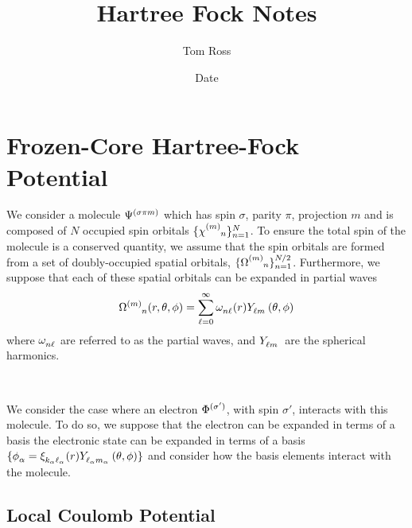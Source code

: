 \documentclass[draft]{article}
\title{Hartree Fock Notes}
\author{Tom Ross}
\date{Date}
\begin{document}
\newcommand{\molecule}[1][]{\Psi\indices{#1}}
\newcommand{\orbitalspin}[1][]{\chi\indices{#1}}

\newcommand{\orbital}[1][]{\Omega\indices{#1}}
\newcommand{\orbitalpw}[1][]{\omega\indices{#1}}

\newcommand{\electron}[1][]{\Phi\indices{#1}}
\newcommand{\sturmian}[1][]{\phi\indices{#1}}
\newcommand{\laguerre}[1][]{\xi\indices{#1}}

\newcommand{\harmonic}[1][]{Y\indices{#1}}
\newcommand{\irrep}[1][]{C\indices{#1}}

\newcommand{\spin}{\sigma}
\newcommand{\parity}{\pi}
\newcommand{\proj}{m}
\renewcommand{\ang}{\ell}

\section{Frozen-Core Hartree-Fock Potential}
\label{sec:frozen-core-hartree}

We consider a molecule $\molecule[^{\lr{\spin \pi \proj}}]$ which has spin
$\spin$, parity $\pi$, projection $\proj$ and is composed of $N$ occupied
spin orbitals $\lrset{\orbitalspin[^{\lr{\proj}}_n]}_{n = 1}^{N}$.  To ensure
the total spin of the molecule is a conserved quantity, we assume that the spin
orbitals are formed from a set of doubly-occupied spatial orbitals,
$\lrset{\orbital[^{\lr{\proj}}_n]}_{n = 1}^{N/2}$.  Furthermore, we suppose that
each of these spatial orbitals can be expanded in partial waves
\begin{equation*}
  \orbital[^{\lr{\proj}}_n]\lr{r, \theta, \phi}
  =
  \sum_{\ang = 0}^{\infty}
  \orbitalpw[_{n \ang}]\lr{r}
  \harmonic[_{\ang \proj}]\lr{\theta, \phi}
\end{equation*}
where $\orbitalpw[_{n \ang}]$ are referred to as the partial waves, and
$\harmonic[_{\ang \proj}]$ are the spherical harmonics.

~

We consider the case where an electron $\electron[^{\lr{\spin'}}]$, with spin
$\spin'$, interacts with this molecule.
To do so, we suppose that the electron can be expanded in terms of a basis
the electronic state can be expanded in terms of a basis
$\lrset{\sturmian[_{\alpha}] =
  \laguerre[_{k_{\alpha} \ang_{\alpha}}]\lr{r}
  \harmonic[_{\ang_{\alpha} \proj_{\alpha}}]\lr{\theta, \phi}}$
and consider how the basis elements interact with the molecule.

\subsection{Local Coulomb Potential}
\label{sec:coulomb}
\end{document}
